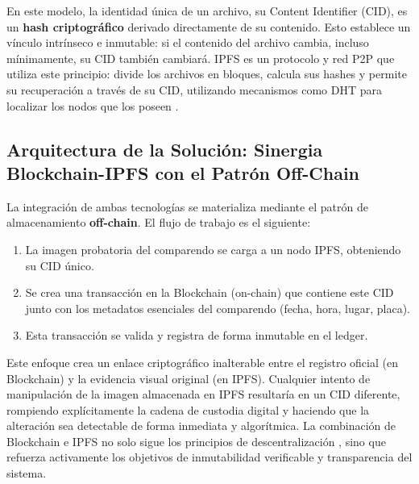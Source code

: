 En este modelo, la identidad única de un archivo, su Content Identifier (CID), es un \textbf{hash criptográfico} derivado directamente de su contenido. Esto establece un vínculo intrínseco e inmutable: si el contenido del archivo cambia, incluso mínimamente, su CID también cambiará. IPFS es un protocolo y red P2P que utiliza este principio: divide los archivos en bloques, calcula sus hashes y permite su recuperación a través de su CID, utilizando mecanismos como DHT para localizar los nodos que los poseen \parencite{maymounkov2002kademlia, benet2014ipfs}.

\subsection{Arquitectura de la Solución: Sinergia Blockchain-IPFS con el Patrón Off-Chain}
La integración de ambas tecnologías se materializa mediante el patrón de almacenamiento \textbf{off-chain}. El flujo de trabajo es el siguiente:
\begin{enumerate}
    \item La imagen probatoria del comparendo se carga a un nodo IPFS, obteniendo su CID único.
    \item Se crea una transacción en la Blockchain (on-chain) que contiene este CID junto con los metadatos esenciales del comparendo (fecha, hora, lugar, placa).
    \item Esta transacción se valida y registra de forma inmutable en el ledger.
\end{enumerate}
Este enfoque crea un enlace criptográfico inalterable entre el registro oficial (en Blockchain) y la evidencia visual original (en IPFS). Cualquier intento de manipulación de la imagen almacenada en IPFS resultaría en un CID diferente, rompiendo explícitamente la cadena de custodia digital y haciendo que la alteración sea detectable de forma inmediata y algorítmica. La combinación de Blockchain e IPFS no solo sigue los principios de descentralización \parencite{vanSteen2017}, sino que refuerza activamente los objetivos de inmutabilidad verificable y transparencia del sistema.

